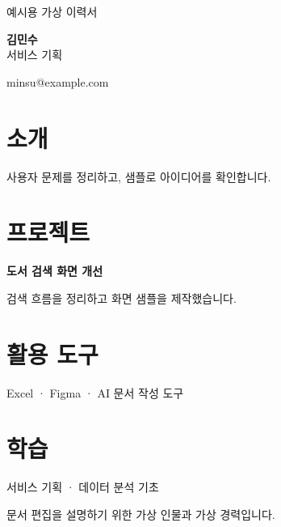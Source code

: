 \documentclass[14pt,a4paper]{extarticle}
\begin{document}
\raggedright
{\small\color{accent} 예시용 가상 이력서}

{\Huge\bfseries 김민수}\\[5pt]
{\large 서비스 기획}\par
{\small minsu@example.com}

\section*{소개}
사용자 문제를 정리하고, 샘플로 아이디어를 확인합니다.

\section*{프로젝트}
\textbf{도서 검색 화면 개선}\par
검색 흐름을 정리하고 화면 샘플을 제작했습니다.

\section*{활용 도구}
Excel · Figma · AI 문서 작성 도구

\section*{학습}
서비스 기획 · 데이터 분석 기초

\vfill
{\small\color{gray} 문서 편집을 설명하기 위한 가상 인물과 가상 경력입니다.}
\end{document}
